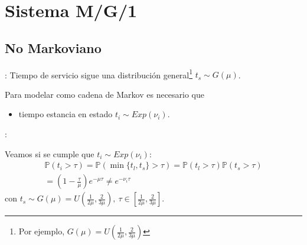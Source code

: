 \documentclass[xcolor={x11names}]{beamer}
\begin{document}
\section{Sistema M/G/1}
\subsection{No Markoviano}
\begin{frame}{\secname: \subsecname}
    Tiempo de servicio sigue una distribución
    general\footnote{Por ejemplo,
    $G(\mu)=U(\tfrac{1}{2\mu}, \tfrac{2}{3\mu})$}
    $t_s\sim G(\mu)$.

    \begin{figure}
        
    \end{figure}

    \vfill
    Para modelar como cadena de Markov
    es necesario que
    \begin{itemize}
        \item tiempo estancia en estado
            $t_i\sim Exp(\nu_i)$.
    \end{itemize}
\end{frame}



\begin{frame}{\secname: \subsecname}
    \begin{figure}
        
    \end{figure}

    \vfill
    Veamos si se cumple que $t_i\sim Exp(\nu_i)$:
    \begin{multline}
        \mathbb{P}(t_i>\tau) =
        \mathbb{P}(\min\{t_l,t_s\}>\tau)=
        \mathbb{P}(t_l>\tau)
        \mathbb{P}(t_s>\tau)\\
        =
        \left(1 - \frac{\tau}{\mu} \right)
        e^{-\mu\tau} \neq e^{-\nu_i \tau}
    \end{multline}
    con $t_s\sim G(\mu)=U\left(\tfrac{1}{2\mu},
    \tfrac{2}{3\mu}\right),\
    \tau\in\left[\tfrac{1}{2\mu},
    \tfrac{2}{3\mu}\right]$.
\end{frame}
\end{document}
